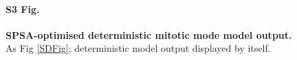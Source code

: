 \documentclass{ut-thesis}
\begin{document}
\begin{NoHyper}
\begin{figure}[p]
\paragraph{S3 Fig.}
\label{deterministicSupplement}
{\bf SPSA-optimised deterministic mitotic mode model output.} As Fig \ref{SDFig}; deterministic model output displayed by itself.
\end{figure}

\begin{figure}[h]

\end{figure}
\end{NoHyper}
\end{document}
